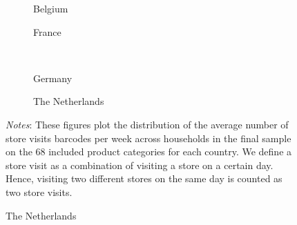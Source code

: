  \begin{figure}[H]
    \centering
    \caption{Store visits per week}
    \label{fig: app_data_households_stores_year}
    \begin{subfigure}[t]{.49\textwidth}
         \centering
         \caption{Belgium}
         \scalebox{0.45}{}
     \end{subfigure}
     \begin{subfigure}[t]{.49\textwidth}
         \centering
         \caption{France}
         \scalebox{0.45}{}
     \end{subfigure}\\
     \begin{subfigure}[t]{.49\textwidth}
         \centering
         \caption{Germany}
         \scalebox{0.45}{}
     \end{subfigure}
     \begin{subfigure}[t]{.49\textwidth}
         \centering
         \caption{The Netherlands}
         \scalebox{0.45}{}
     \end{subfigure}
     \parbox{\textwidth}{
        \begin{spacing}{1} 
            {\footnotesize 
            \textit{Notes}: These figures plot the distribution of the average number of store visits barcodes per week across households in the final sample on the 68 included product categories for each country. We define a store visit as a combination of visiting a store on a certain day. Hence, visiting two different stores on the same day is counted as two store visits.}
        \end{spacing}}
 \end{figure} 


